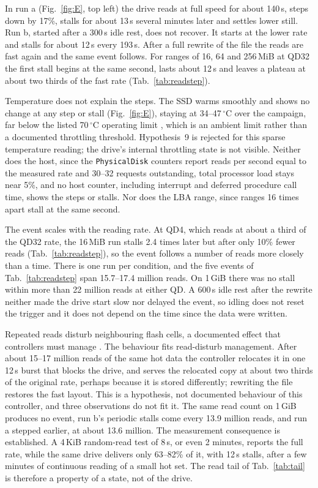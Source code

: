 \documentclass{article}
\begin{document}
In run a (Fig.~\ref{fig:E}, top left) the drive reads at full speed for about 140\,s, steps down by 17\%, stalls for about 13\,s several minutes later and settles lower still. Run b, started after a 300\,s idle rest, does not recover. It starts at the lower rate and stalls for about 12\,s every 193\,s. After a full rewrite of the file the reads are fast again and the same event follows. For ranges of 16, 64 and 256\,MiB at QD32 the first stall begins at the same second, lasts about 12\,s and leaves a plateau at about two thirds of the fast rate (Tab.~\ref{tab:readstep}).

Temperature does not explain the steps. The SSD warms smoothly and shows no change at any step or stall (Fig.~\ref{fig:E}), staying at 34--47\,$^{\circ}$C over the campaign, far below the listed 70\,$^{\circ}$C operating limit \cite{kabum}, which is an ambient limit rather than a documented throttling threshold. Hypothesis~9 is rejected for this sparse temperature reading; the drive's internal throttling state is not visible. Neither does the host, since the \texttt{PhysicalDisk} counters report reads per second equal to the measured rate and 30--32 requests outstanding, total processor load stays near 5\%, and no host counter, including interrupt and deferred procedure call time, shows the steps or stalls. Nor does the LBA range, since ranges 16 times apart stall at the same second.

The event scales with the reading rate. At QD4, which reads at about a third of the QD32 rate, the 16\,MiB run stalls 2.4 times later but after only 10\% fewer reads (Tab.~\ref{tab:readstep}), so the event follows a number of reads more closely than a time. There is one run per condition, and the five events of Tab.~\ref{tab:readstep} span 15.7--17.4 million reads. On 1\,GiB there was no stall within more than 22 million reads at either QD. A 600\,s idle rest after the rewrite neither made the drive start slow nor delayed the event, so idling does not reset the trigger and it does not depend on the time since the data were written.

Repeated reads disturb neighbouring flash cells, a documented effect that controllers must manage \cite{cai2015,cai2017}. The behaviour fits read-disturb management. After about 15--17 million reads of the same hot data the controller relocates it in one 12\,s burst that blocks the drive, and serves the relocated copy at about two thirds of the original rate, perhaps because it is stored differently; rewriting the file restores the fast layout. This is a hypothesis, not documented behaviour of this controller, and three observations do not fit it. The same read count on 1\,GiB produces no event, run b's periodic stalls come every 13.9 million reads, and run a stepped earlier, at about 13.6 million. The measurement consequence is established. A 4\,KiB random-read test of 8\,s, or even 2 minutes, reports the full rate, while the same drive delivers only 63--82\% of it, with 12\,s stalls, after a few minutes of continuous reading of a small hot set. The read tail of Tab.~\ref{tab:tail} is therefore a property of a state, not of the drive.
\end{document}

